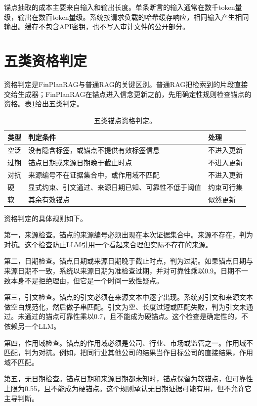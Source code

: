 锚点抽取的成本主要来自输入和输出长度。单条断言的输入通常在数千token量级，输出在数百token量级。系统按请求负载的哈希缓存响应，相同输入产生相同输出。缓存不包含API密钥，也不写入审计文件的公开部分。

\section{五类资格判定}

资格判定是FinPlanRAG与普通RAG的关键区别。普通RAG把检索到的片段直接交给生成器；FinPlanRAG在锚点进入信念更新之前，先用确定性规则检查锚点的资格。表\ref{tab:qualification}给出五类判定。

\begin{table}[H]
\centering
{}
\caption{五类锚点资格判定。}
\label{tab:qualification}
\begin{tabular}{p{2.1cm}p{7.0cm}p{4.2cm}}
\toprule
类型 & 判定条件 & 处理 \\
\midrule
空泛 & 没有隐含标签，或锚点不提供有效标签信息 & 不进入更新 \\
过期 & 锚点日期或来源日期晚于截止时点 & 不进入更新 \\
对抗 & 来源编号不在证据集合中，或作用域不匹配 & 不进入更新 \\
硬 & 显式约束、引文通过、来源日期已知、可靠性不低于阈值 & 约束可行集 \\
软 & 其余有效锚点 & 似然更新 \\
\bottomrule
\end{tabular}
\end{table}

资格判定的具体规则如下。

第一，来源检查。锚点的来源编号必须出现在本次证据集合中。来源不存在，判为对抗。这个检查防止LLM引用一个看起来合理但实际不存在的来源。

第二，日期检查。锚点日期或来源日期晚于截止时点，判为过期。如果锚点日期与来源日期不一致，系统以来源日期为准检查过期，并对可靠性乘以0.9。日期不一致本身不是拒绝理由，但它是一个时间一致性疑点。

第三，引文检查。锚点的引文必须在来源文本中逐字出现。系统对引文和来源文本做空白规范化，然后做子串匹配。引文为空、长度过短或匹配失败，判为引文未通过。未通过的锚点可靠性乘以0.7，且不能成为硬锚点。这个检查是确定性的，不依赖另一个LLM。

第四，作用域检查。锚点的作用域必须是公司、行业、市场或监管之一。作用域不匹配，判为对抗。例如，把同行业其他公司的结果当作目标公司的直接结果，作用域不匹配。

第五，无日期检查。锚点日期和来源日期都未知时，锚点保留为软锚点，但可靠性上限为0.55，且不能成为硬锚点。这个规则承认无日期证据可能有用，但不允许它主导判断。

